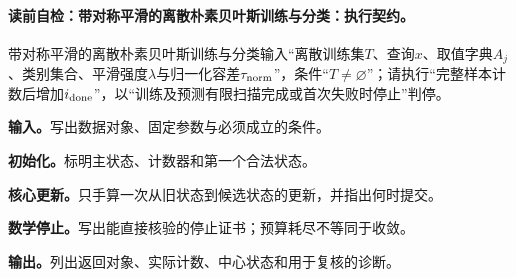 \paragraph{读前自检：带对称平滑的离散朴素贝叶斯训练与分类：执行契约。}带对称平滑的离散朴素贝叶斯训练与分类输入“离散训练集$T$、查询$x$、取值字典$A_j$、类别集合、平滑强度$\lambda$与归一化容差$\tau_{\rm norm}$”，条件“$T\ne\varnothing$”；请执行“完整样本计数后增加$i_{\rm done}$”，以“训练及预测有限扫描完成或首次失败时停止”判停。\par
\begin{keypointbox}[title={带对称平滑的离散朴素贝叶斯训练与分类：五步阅读}]
\textbf{输入。}写出数据对象、固定参数与必须成立的条件。\par
\textbf{初始化。}标明主状态、计数器和第一个合法状态。\par
\textbf{核心更新。}只手算一次从旧状态到候选状态的更新，并指出何时提交。\par
\textbf{数学停止。}写出能直接核验的停止证书；预算耗尽不等同于收敛。\par
\textbf{输出。}列出返回对象、实际计数、中心状态和用于复核的诊断。
\end{keypointbox}

